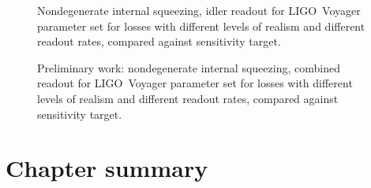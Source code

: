 
\begin{figure}
	\centering
	\caption{Nondegenerate internal squeezing, idler readout for LIGO~Voyager parameter set for losses with different levels of realism and different readout rates, compared against sensitivity target.}
	\label{fig:}
\end{figure}


\begin{figure}
	\centering
	\caption{Preliminary work: nondegenerate internal squeezing, combined readout for LIGO~Voyager parameter set for losses with different levels of realism and different readout rates, compared against sensitivity target.}
	\label{fig:}
\end{figure}





\section{Chapter summary}




